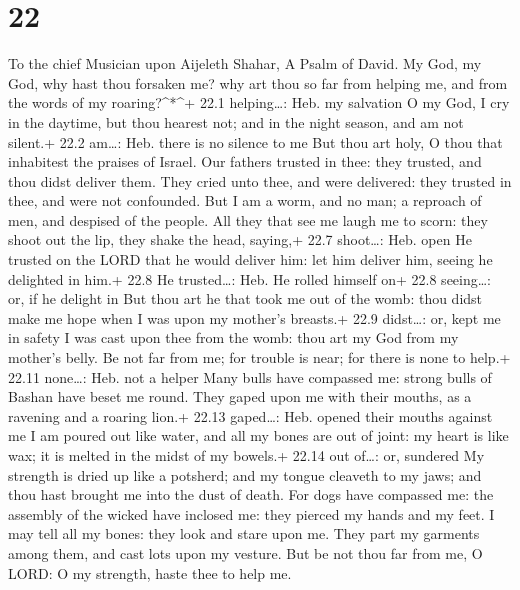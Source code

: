 \hypertarget{section-21}{%
\section{22}\label{section-21}}

To the chief Musician upon Aijeleth Shahar, A Psalm of David.
 My God, my God, why hast thou forsaken me? why art thou so
far from helping me, and from the words of my roaring?\^{}*\^{}+ 22.1
helping\ldots: Heb. my salvation  O my God, I cry in the
daytime, but thou hearest not; and in the night season, and am not
silent.+ 22.2 am\ldots: Heb. there is no silence to me  But
thou art holy, O thou that inhabitest the praises of Israel.
 Our fathers trusted in thee: they trusted, and thou didst
deliver them.  They cried unto thee, and were delivered:
they trusted in thee, and were not confounded.  But I am a
worm, and no man; a reproach of men, and despised of the people.
 All they that see me laugh me to scorn: they shoot out the
lip, they shake the head, saying,+ 22.7 shoot\ldots: Heb. open
 He trusted on the LORD that he would deliver him: let him
deliver him, seeing he delighted in him.+ 22.8 He trusted\ldots: Heb. He
rolled himself on+ 22.8 seeing\ldots: or, if he delight in 
But thou art he that took me out of the womb: thou didst make me hope
when I was upon my mother's breasts.+ 22.9 didst\ldots: or, kept me in
safety  I was cast upon thee from the womb: thou art my God
from my mother's belly.  Be not far from me; for trouble is
near; for there is none to help.+ 22.11 none\ldots: Heb. not a helper
 Many bulls have compassed me: strong bulls of Bashan have
beset me round.  They gaped upon me with their mouths, as a
ravening and a roaring lion.+ 22.13 gaped\ldots: Heb. opened their
mouths against me  I am poured out like water, and all my
bones are out of joint: my heart is like wax; it is melted in the midst
of my bowels.+ 22.14 out of\ldots: or, sundered  My
strength is dried up like a potsherd; and my tongue cleaveth to my jaws;
and thou hast brought me into the dust of death.  For dogs
have compassed me: the assembly of the wicked have inclosed me: they
pierced my hands and my feet.  I may tell all my bones:
they look and stare upon me.  They part my garments among
them, and cast lots upon my vesture.  But be not thou far
from me, O LORD: O my strength, haste thee to help me. 
